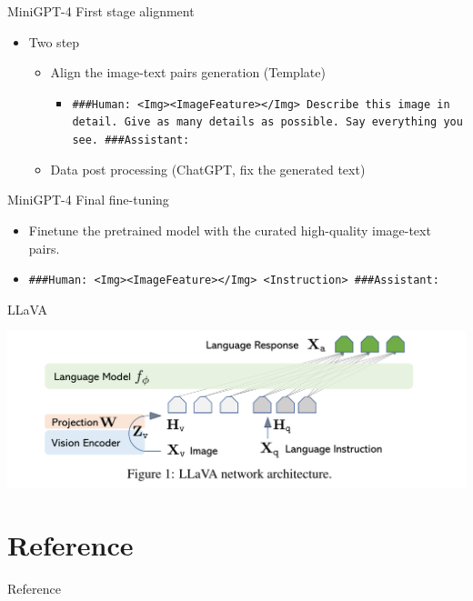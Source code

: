 \documentclass[aspectratio=1610,xcolor={dvipsnames},hyperref={colorlinks,unicode,linkcolor=violet,anchorcolor=BlueViolet,citecolor=YellowOrange,filecolor=black,urlcolor=Aquamarine}]{beamer}
\begin{document}
\begin{frame}[label={sec:org73dfd89},fragile]{MiniGPT-4 First stage alignment}
 \begin{itemize}
\item Two step
\begin{itemize}
\item Align the image-text pairs generation (Template)
\begin{itemize}
\item \texttt{\#\#\#Human: <Img><ImageFeature></Img> Describe this image in detail. Give as many details as possible. Say everything you see. \#\#\#Assistant:}
\end{itemize}
\item Data post processing (ChatGPT, fix the generated text)
\end{itemize}
\end{itemize}
\end{frame}

\begin{frame}[label={sec:org1e07214},fragile]{MiniGPT-4 Final fine-tuning}
 \begin{itemize}
\item Finetune the pretrained model with the curated high-quality image-text pairs.

\item \texttt{\#\#\#Human: <Img><ImageFeature></Img> <Instruction> \#\#\#Assistant:}
\end{itemize}
\end{frame}

\begin{frame}[label={sec:orgc5fa8ac}]{LLaVA}
\begin{center}
\includegraphics[width=.9\linewidth]{./p3.png}
\end{center}
\end{frame}

\section{Reference}
\label{sec:org76ee680}

\begin{frame}[allowframebreaks]{Reference}
\printbibliography
\end{frame}
\end{document}

